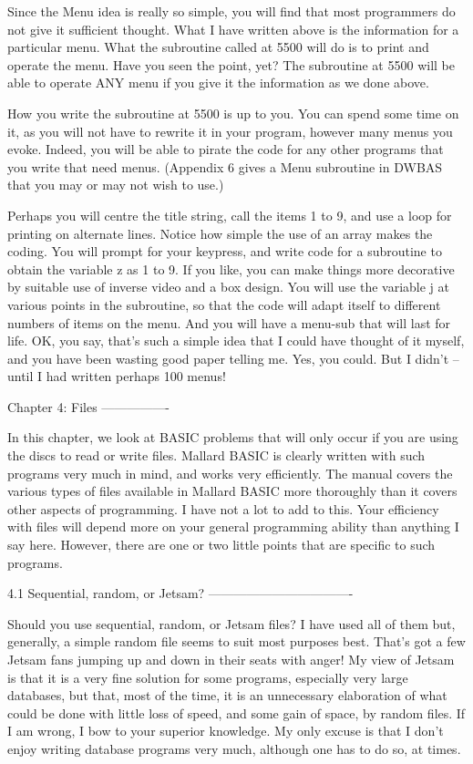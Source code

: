 Since  the Menu idea is really so simple, you will find that most  programmers 
do  not  give  it  sufficient  thought. What  I  have  written  above  is  the 
information for a particular menu. What the subroutine called at 5500 will  do 
is to print and operate the menu. Have you seen the point, yet? The subroutine 
at 5500 will be able to operate ANY menu if you give it the information as  we 
done above.

How you write the subroutine at 5500 is up to you. You can spend some time  on 
it, as you will not have to rewrite it in your program, however many menus you 
evoke. Indeed, you will be able to pirate the code for any other programs that 
you  write that need menus. (Appendix 6 gives a Menu subroutine in DWBAS  that 
you may or may not wish to use.)

Perhaps  you  will centre the title string, call the items 1 to 9, and  use  a 
loop  for printing on alternate lines. Notice how simple the use of  an  array 
makes  the  coding. You will prompt for your keypress, and write  code  for  a 
subroutine  to  obtain  the variable z as 1 to 9. If you like,  you  can  make 
things more decorative by suitable use of inverse video and a box design.  You 
will use the variable j at various points in the subroutine, so that the  code 
will adapt itself to different numbers of items on the menu. And you will have 
a  menu-sub  that will last for life. OK, you say, that's such a  simple  idea 
that  I could have thought of it myself, and you have been wasting good  paper 
telling  me. Yes, you could. But I didn't -- until I had written  perhaps  100 
menus!


Chapter 4: Files
----------------

In  this  chapter, we look at BASIC problems that will only occur if  you  are 
using the discs to read or write files. Mallard BASIC is clearly written  with 
such programs very much in mind, and works very efficiently. The manual covers 
the various types of files available in Mallard BASIC more thoroughly than  it 
covers  other  aspects of programming. I have not a lot to add to  this.  Your 
efficiency  with  files will depend more on your general  programming  ability 
than anything I say here. However, there are one or two little points that are 
specific to such programs.


4.1 Sequential, random, or Jetsam?
----------------------------------

Should  you use sequential, random, or Jetsam files? I have used all  of  them 
but, generally, a simple random file seems to suit most purposes best.  That's 
got  a few Jetsam fans jumping up and down in their seats with anger! My  view 
of  Jetsam  is that it is a very fine solution for some  programs,  especially 
very  large  databases,  but  that, most of the time,  it  is  an  unnecessary 
elaboration of what could be done with little loss of speed, and some gain  of 
space,  by random files. If I am wrong, I bow to your superior  knowledge.  My 
only  excuse  is  that  I don't enjoy writing  database  programs  very  much, 
although one has to do so, at times.

